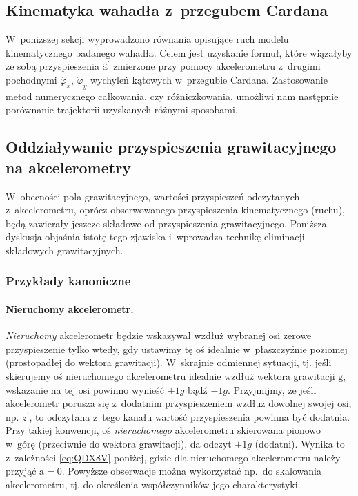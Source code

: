 \documentclass[paper=a4,DIV=12]{lpas}
\newcommand{\brm}[1]{\bm{\mathrm{#1}}}
\begin{document}
\begin{appendices}
\section{Kinematyka wahadła z~przegubem Cardana}
\label{sec:4XR18}

W~poniższej sekcji wyprowadzono równania opisujące ruch modelu kinematycznego
badanego wahadła. Celem jest uzyskanie formuł, które wiązałyby ze sobą
przyspieszenia $\hat{\brm{a}}^{\prime}$ zmierzone przy pomocy akcelerometru
z~drugimi pochodnymi $\ddot{\varphi}_x$, $\ddot{\varphi}_y$ wychyleń kątowych
w~przegubie Cardana. Zastosowanie metod numerycznego całkowania, czy
różniczkowania, umożliwi nam następnie porównanie trajektorii uzyskanych
różnymi sposobami.

\subsection{Oddziaływanie przyspieszenia grawitacyjnego na akcelerometry}
\label{sec:LIIHL}

W~obecności pola grawitacyjnego, wartości przyspieszeń odczytanych
z~akcelerometru, oprócz obserwowanego przyspieszenia kinematycznego (ruchu),
będą zawierały jeszcze składowe od przyspieszenia grawitacyjnego. Poniższa
dyskusja objaśnia istotę tego zjawiska i~wprowadza technikę eliminacji
składowych grawitacyjnych.

\subsubsection{Przykłady kanoniczne}
\label{sec:YFBVX}

\paragraph{Nieruchomy akcelerometr.}
{\em Nieruchomy} akcelerometr będzie wskazywał wzdłuż wybranej osi  zerowe
przyspieszenie tylko wtedy, gdy ustawimy tę oś idealnie w~płaszczyźnie
poziomej (prostopadłej do wektora grawitacji). W~skrajnie odmiennej sytuacji,
tj. jeśli skierujemy oś nieruchomego akcelerometru idealnie wzdłuż wektora
grawitacji $\brm{g}$, wskazanie na tej osi powinno wynieść $+1g$ bądź $-1g$.
Przyjmijmy, że jeśli akcelerometr porusza się z~dodatnim przyspieszeniem wzdłuż
dowolnej swojej osi, np. $z^{\prime}$, to odczytana z~tego kanału wartość
przyspieszenia powinna być dodatnia. Przy takiej konwencji, oś {\em
nieruchomego} akcelerometru skierowana pionowo w~górę (przeciwnie do wektora
grawitacji), da odczyt $+1g$ (dodatni). Wynika to z~zależności
\eqref{eq:QDX8V} poniżej, gdzie dla nieruchomego akcelerometru należy
przyjąć $\brm{a} = \brm{0}$. Powyższe obserwacje można wykorzystać np.~do
skalowania akcelerometru, tj. do określenia współczynników jego
charakterystyki.


\end{appendices}
\end{document}

